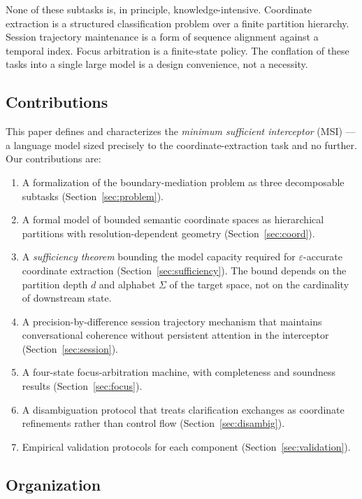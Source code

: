 \documentclass[11pt,a4paper]{article}
\theoremstyle{definition}
\theoremstyle{remark}
\begin{document}
None of these subtasks is, in principle, knowledge-intensive. Coordinate extraction is a structured classification problem over a finite partition hierarchy. Session trajectory maintenance is a form of sequence alignment against a temporal index. Focus arbitration is a finite-state policy. The conflation of these tasks into a single large model is a design convenience, not a necessity.

\subsection{Contributions}

This paper defines and characterizes the \emph{minimum sufficient interceptor} (MSI) --- a language model sized precisely to the coordinate-extraction task and no further. Our contributions are:

\begin{enumerate}
    \item A formalization of the boundary-mediation problem as three decomposable subtasks (Section~\ref{sec:problem}).
    \item A formal model of bounded semantic coordinate spaces as hierarchical partitions with resolution-dependent geometry (Section~\ref{sec:coord}).
    \item A \emph{sufficiency theorem} bounding the model capacity required for $\varepsilon$-accurate coordinate extraction (Section~\ref{sec:sufficiency}). The bound depends on the partition depth $d$ and alphabet $\Sigma$ of the target space, not on the cardinality of downstream state.
    \item A precision-by-difference session trajectory mechanism that maintains conversational coherence without persistent attention in the interceptor (Section~\ref{sec:session}).
    \item A four-state focus-arbitration machine, with completeness and soundness results (Section~\ref{sec:focus}).
    \item A disambiguation protocol that treats clarification exchanges as coordinate refinements rather than control flow (Section~\ref{sec:disambig}).
    \item Empirical validation protocols for each component (Section~\ref{sec:validation}).
\end{enumerate}

\subsection{Organization}
\end{document}
